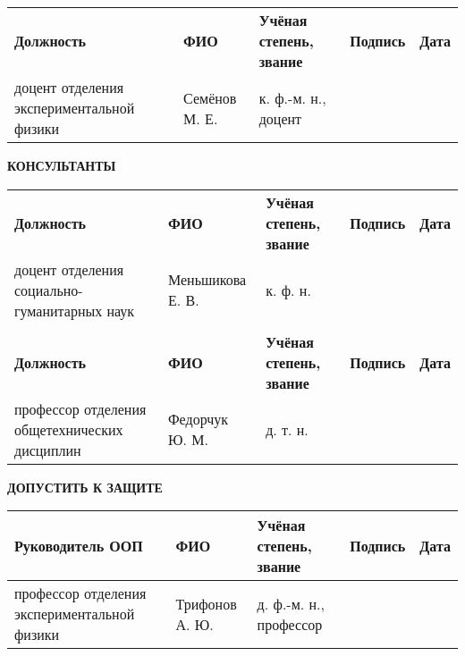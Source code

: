 \begin{titlepage}
\vspace{\fill}

\begin{tabularx}{\textwidth}
{|>{\hsize}Y|>{\hsize}Y|>{\hsize}Y|>{\hsize}Y|>{\hsize}Y|}
     \\
    \hline
    \scriptsize \textbf{Должность} 
        & \scriptsize \textbf{ФИО} 
        & \scriptsize \textbf{Учёная степень, звание} 
        & \scriptsize \textbf{Подпись} 
        & \scriptsize \textbf{Дата} \\
    \hline
    доцент отделения экспериментальной физики & Семёнов М. Е.\bigstrut & к. ф.-м. н., доцент & & \\ 
    \hline
\end{tabularx}

\vspace{\fill}

\MakeUppercase{\textbf{Консультанты}}
\begin{tabularx}{\textwidth}
{|>{\hsize}Y|>{\hsize}Y|>{\hsize}Y|>{\hsize}Y|>{\hsize}Y|}
     \bigstrut[t] \\
    \hline
    \scriptsize \textbf{Должность} 
        & \scriptsize \textbf{ФИО} 
        & \scriptsize \textbf{Учёная степень, звание} 
        & \scriptsize \textbf{Подпись} 
        & \scriptsize \textbf{Дата} \\
    \hline
    доцент отделения социально-гуманитарных наук & Меньшикова Е. В.\bigstrut & к. ф. н. & & \\ 
    \hline
     \bigstrut[t] \\
    \hline
    \scriptsize \textbf{Должность} 
        & \scriptsize \textbf{ФИО} 
        & \scriptsize \textbf{Учёная степень, звание} 
        & \scriptsize \textbf{Подпись} 
        & \scriptsize \textbf{Дата} \\
    \hline
    профессор отделения общетехнических дисциплин & Федорчук Ю. М.\bigstrut & д. т. н. & & \\ 
    \hline
\end{tabularx}

\vspace{\fill}

\MakeUppercase{\textbf{Допустить к защите}}
\begin{tabularx}{\textwidth}
{|>{\hsize}Y|>{\hsize}Y|>{\hsize}Y|>{\hsize}Y|>{\hsize}Y|}
    \hline
    \scriptsize \textbf{Руководитель ООП} 
        & \scriptsize \textbf{ФИО} 
        & \scriptsize \textbf{Учёная степень, звание} 
        & \scriptsize \textbf{Подпись} 
        & \scriptsize \textbf{Дата} \\
    \hline
    профессор отделения экспериментальной физики & Трифонов А. Ю.\bigstrut & д. ф.-м. н., профессор & & \\ 
    \hline
\end{tabularx}


\end{titlepage}
